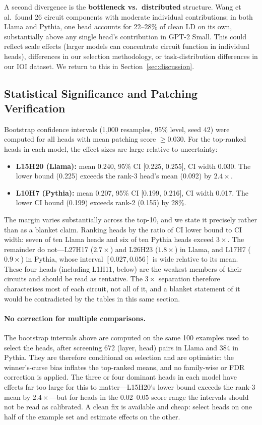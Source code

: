 \documentclass[11pt,a4paper]{article}
\begin{document}
A second divergence is the \textbf{bottleneck vs.\ distributed} structure. Wang et
al.\ found 26 circuit components with moderate individual contributions; in both Llama
and Pythia, one head accounts for 22--28\% of clean LD on its own, substantially above
any single head's contribution in GPT-2 Small. This could reflect scale effects (larger
models can concentrate circuit function in individual heads), differences in our
selection methodology, or task-distribution differences in our IOI dataset. We return
to this in Section~\ref{sec:discussion}.

\subsection{Statistical Significance and Patching Verification}

Bootstrap confidence intervals (1{,}000 resamples, 95\% level, seed 42) were computed
for all heads with mean patching score $\geq 0.030$. For the top-ranked heads in each
model, the effect sizes are large relative to uncertainty:

\begin{itemize}
  \item \textbf{L15H20 (Llama):} mean 0.240, 95\% CI [0.225, 0.255], CI width 0.030.
    The lower bound (0.225) exceeds the rank-3 head's mean (0.092) by $2.4\times$.
  \item \textbf{L10H7 (Pythia):} mean 0.207, 95\% CI [0.199, 0.216], CI width 0.017.
    The lower CI bound (0.199) exceeds rank-2 (0.155) by 28\%.
\end{itemize}

The margin varies substantially across the top-10, and we state it precisely rather
than as a blanket claim. Ranking heads by the ratio of CI lower bound to CI width:
seven of ten Llama heads and six of ten Pythia heads exceed $3\times$. The remainder
do not---L27H17 ($2.7\times$) and L26H23 ($1.8\times$) in Llama, and L17H7
($0.9\times$) in Pythia, whose interval $[0.027, 0.056]$ is wide relative to its mean.
These four heads (including L1H11, below) are the weakest members of their circuits and
should be read as tentative. The $3\times$ separation therefore characterises most of
each circuit, not all of it, and a blanket statement of it would be contradicted by the
tables in this same section.

\paragraph{No correction for multiple comparisons.} The bootstrap intervals above are
computed on the same 100 examples used to select the heads, after screening 672
(layer, head) pairs in Llama and 384 in Pythia. They are therefore conditional on
selection and are optimistic: the winner's-curse bias inflates the top-ranked means,
and no family-wise or FDR correction is applied. The three or four dominant heads in
each model have effects far too large for this to matter---L15H20's lower bound
exceeds the rank-3 mean by $2.4\times$---but for heads in the 0.02--0.05 score range
the intervals should not be read as calibrated. A clean fix is available and cheap:
select heads on one half of the example set and estimate effects on the other.
\end{document}
